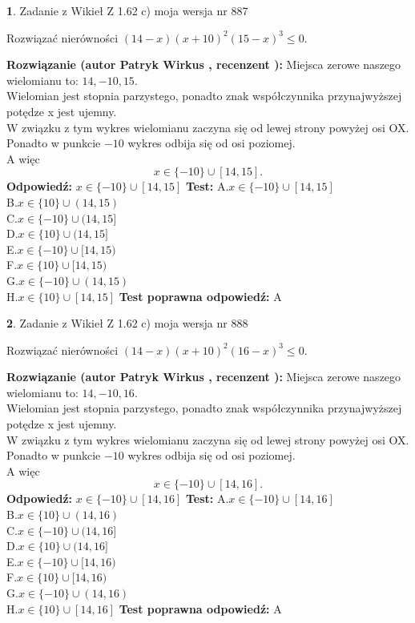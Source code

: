 \documentclass[12pt, a4paper]{article}
\theoremstyle{definition} %
\newtheorem{zad}{}
\newcommand{\zadStart}[1]{\begin{zad}#1\newline}
\newcommand{\zadStop}{\end{zad}}
\newcommand{\rozwStart}[2]{\noindent \textbf{Rozwiązanie (autor #1 , recenzent #2): }\newline}
\newcommand{\rozwStop}{\newline}
\newcommand{\odpStart}{\noindent \textbf{Odpowiedź:}\newline}
\newcommand{\odpStop}{\newline}
\newcommand{\testStart}{\noindent \textbf{Test:}\newline}
\newcommand{\testStop}{\newline}
\newcommand{\kluczStart}{\noindent \textbf{Test poprawna odpowiedź:}\newline}
\newcommand{\kluczStop}{\newline}
\begin{document}
\zadStart{Zadanie z Wikieł Z 1.62 c) moja wersja nr 887}

Rozwiązać nierówności $(14-x)(x+10)^{2}(15-x)^{3}\le0$.
\zadStop
\rozwStart{Patryk Wirkus}{}
Miejsca zerowe naszego wielomianu to: $14, -10, 15$.\\
Wielomian jest stopnia parzystego, ponadto znak współczynnika przy\linebreak najwyższej potędze x jest ujemny.\\ W związku z tym wykres wielomianu zaczyna się od lewej strony powyżej osi OX.\\
Ponadto w punkcie $-10$ wykres odbija się od osi poziomej.\\
A więc $$x \in \{-10\} \cup [14,15].$$
\rozwStop
\odpStart
$x \in \{-10\} \cup [14,15]$
\odpStop
\testStart
A.$x \in \{-10\} \cup [14,15]$\\
B.$x \in \{10\} \cup (14,15)$\\
C.$x \in \{-10\} \cup (14,15]$\\
D.$x \in \{10\} \cup (14,15]$\\
E.$x \in \{-10\} \cup [14,15)$\\
F.$x \in \{10\} \cup [14,15)$\\
G.$x \in \{-10\} \cup (14,15)$\\
H.$x \in \{10\} \cup [14,15]$
\testStop
\kluczStart
A
\kluczStop



\zadStart{Zadanie z Wikieł Z 1.62 c) moja wersja nr 888}

Rozwiązać nierówności $(14-x)(x+10)^{2}(16-x)^{3}\le0$.
\zadStop
\rozwStart{Patryk Wirkus}{}
Miejsca zerowe naszego wielomianu to: $14, -10, 16$.\\
Wielomian jest stopnia parzystego, ponadto znak współczynnika przy\linebreak najwyższej potędze x jest ujemny.\\ W związku z tym wykres wielomianu zaczyna się od lewej strony powyżej osi OX.\\
Ponadto w punkcie $-10$ wykres odbija się od osi poziomej.\\
A więc $$x \in \{-10\} \cup [14,16].$$
\rozwStop
\odpStart
$x \in \{-10\} \cup [14,16]$
\odpStop
\testStart
A.$x \in \{-10\} \cup [14,16]$\\
B.$x \in \{10\} \cup (14,16)$\\
C.$x \in \{-10\} \cup (14,16]$\\
D.$x \in \{10\} \cup (14,16]$\\
E.$x \in \{-10\} \cup [14,16)$\\
F.$x \in \{10\} \cup [14,16)$\\
G.$x \in \{-10\} \cup (14,16)$\\
H.$x \in \{10\} \cup [14,16]$
\testStop
\kluczStart
A
\kluczStop
\end{document}
